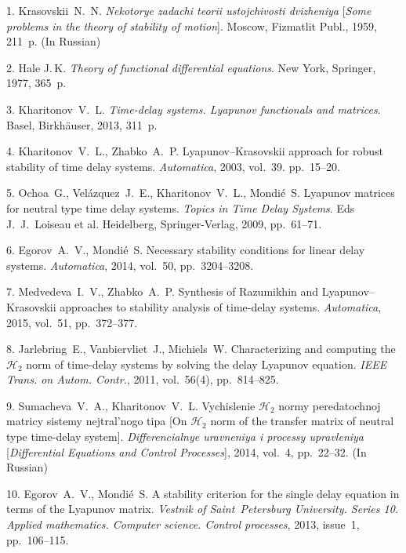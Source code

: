 

{\footnotesize

\vskip 2mm


\vskip 1.5mm



1. Krasovskii~N.~N. \textit{Nekotorye zadachi teorii ustojchivosti
dvizheniya} [\textit{Some problems in the theory of stability of
motion}]. Moscow, Fizmatlit Publ., 1959, 211~p. (In Russian)

2. Hale J.\,K. \textit{Theory of functional differential
equations}. New York, Springer, 1977, 365~p.

3. Kharitonov~V.~L. \textit{Time-delay systems. Lyapunov
functionals and matrices}. Basel, Birkh\"au\-ser, 2013, 311~p.

4. Kharitonov~V.~L., Zhabko~A.~P. \mbox{Lyapunov--Krasovskii}
approach for robust stability of time delay systems.
\textit{Automatica}, 2003, vol.~39. pp.~15--20.

5. Ochoa~G., Vel\'azquez~J.~E., Kharitonov~V.~L., Mondi\'e~S.
Lyapunov matrices for neutral type time delay systems.
\textit{Topics in Time Delay Systems}. Eds J.~J.~Loiseau et al.
Heidelberg, Springer-Verlag, 2009, pp.~61--71.

6. Egorov~A.~V., Mondi\'e~S. Necessary stability conditions for
linear delay systems. \textit{Automatica}, 2014, vol.~50,
pp.~3204--3208.

7. Medvedeva~I.~V., Zhabko~A.~P. Synthesis of Razumikhin and
\mbox{Lyapunov--Krasovskii} appro\-aches to stability analysis of
time-delay systems. \textit{Automatica}, 2015, vol.~51,
pp.~372--377.

8. Jarlebring~E., Vanbiervliet~J., Michiels~W. Characterizing and
computing the $\mathcal{H}_2$ norm of time-delay systems by
solving the delay Lyapunov equation. \textit{IEEE Trans. on Autom.
Contr.}, 2011, vol.~56(4), pp.~814--825.

9. Sumacheva~V.~A., Kharitonov~V.~L. Vychislenie $\mathcal{H}_2$
normy peredatochnoj matricy sistemy nejtral'nogo tipa [On
$\mathcal{H}_2$ norm of the transfer matrix of neutral type
time-delay system]. \textit{Differenci\-alnye uravneniya i
processy upravleniya} [\textit{Differential Equations and Control
Processes}], 2014, vol.~4, pp.~22--32. (In Russian)

10. Egorov~A.~V., Mondi\'{e}~S. A stability criterion for the
single delay equation in terms of the Lyapunov matrix.
\textit{Vestnik of Saint~Petersburg University. Series 10. Applied
mathematics. Computer science. Control processes}, 2013, issue~1,
pp.~106--115.

}
